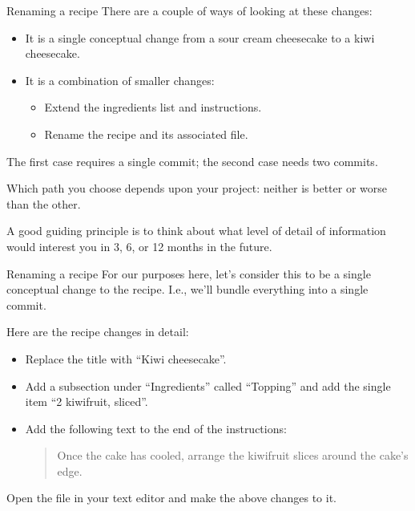\begin{frame}[fragile]{Renaming a recipe}
    There are a couple of ways of looking at these changes:
    \begin{itemize}
        \item It is a single conceptual change from a sour cream
            cheesecake to a kiwi cheesecake.
        \item It is a combination of smaller changes:
            \begin{itemize}
                \item Extend the ingredients list and instructions.
                \item Rename the recipe and its associated file.
            \end{itemize}
    \end{itemize}

    The first case requires a single commit;  the second case needs two
    commits.

    Which path you choose depends upon your project: neither is better or
    worse than the other.

    A good guiding principle is to think about what level of detail of
    information would interest you in 3, 6, or 12 months in the future.
\end{frame}

\begin{frame}[fragile]{Renaming a recipe}
    For our purposes here, let's consider this to be a single conceptual
    change to the recipe.  I.e., we'll bundle everything into a single
    commit.

    Here are the recipe changes in detail:
    \begin{itemize}
        \item Replace the title with ``Kiwi cheesecake''.
        \item Add a subsection under ``Ingredients'' called ``Topping'' and
            add the single item ``2 kiwifruit, sliced''.
        \item Add the following text to the end of the instructions:
            \begin{quote}
                Once the cake has cooled, arrange the kiwifruit slices around the cake's edge.
            \end{quote}
    \end{itemize}

    Open the file  in your text
    editor and make the above changes to it.
\end{frame}

